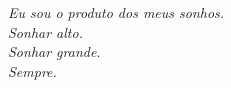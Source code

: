 \begin{epigrafe}
    \vspace*{\fill}
	\begin{flushright}
		\textit{Eu sou o produto dos meus sonhos.\\ 
		Sonhar alto. \\ 
		Sonhar grande. \\ 
		Sempre.}
	\end{flushright}
\end{epigrafe}